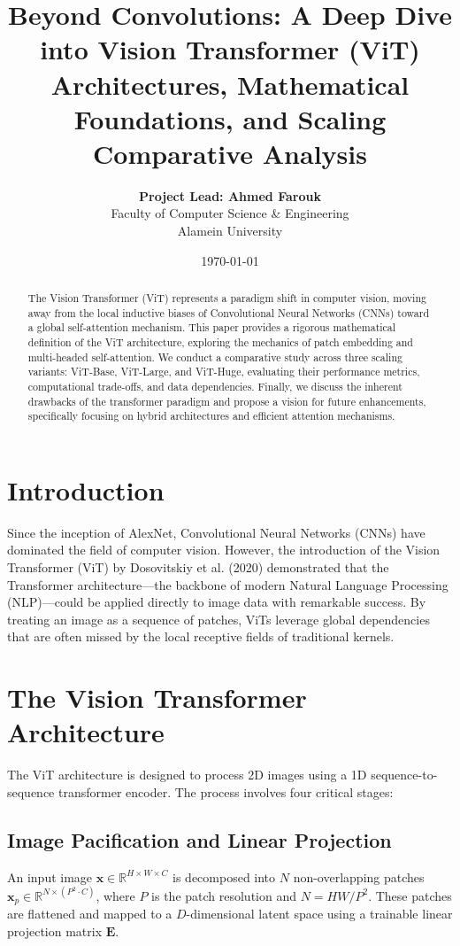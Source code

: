 \documentclass[twocolumn,10pt]{article}
\title{\textbf{Beyond Convolutions: A Deep Dive into Vision Transformer (ViT) Architectures, Mathematical Foundations, and Scaling Comparative Analysis}}
\author{
    \textbf{Project Lead: Ahmed Farouk} \\
    Faculty of Computer Science \& Engineering \\
    Alamein University
}
\date{\today}
\begin{document}
\maketitle

\begin{abstract}
The Vision Transformer (ViT) represents a paradigm shift in computer vision, moving away from the local inductive biases of Convolutional Neural Networks (CNNs) toward a global self-attention mechanism. This paper provides a rigorous mathematical definition of the ViT architecture, exploring the mechanics of patch embedding and multi-headed self-attention. We conduct a comparative study across three scaling variants: ViT-Base, ViT-Large, and ViT-Huge, evaluating their performance metrics, computational trade-offs, and data dependencies. Finally, we discuss the inherent drawbacks of the transformer paradigm and propose a vision for future enhancements, specifically focusing on hybrid architectures and efficient attention mechanisms.
\end{abstract}

\section{Introduction}
Since the inception of AlexNet, Convolutional Neural Networks (CNNs) have dominated the field of computer vision. However, the introduction of the Vision Transformer (ViT) by Dosovitskiy et al. (2020) demonstrated that the Transformer architecture—the backbone of modern Natural Language Processing (NLP)—could be applied directly to image data with remarkable success. By treating an image as a sequence of patches, ViTs leverage global dependencies that are often missed by the local receptive fields of traditional kernels.

\section{The Vision Transformer Architecture}
The ViT architecture is designed to process 2D images using a 1D sequence-to-sequence transformer encoder. The process involves four critical stages:

\subsection{Image Pacification and Linear Projection}
An input image $\mathbf{x} \in \mathbb{R}^{H \times W \times C}$ is decomposed into $N$ non-overlapping patches $\mathbf{x}_p \in \mathbb{R}^{N \times (P^2 \cdot C)}$, where $P$ is the patch resolution and $N = HW/P^2$. These patches are flattened and mapped to a $D$-dimensional latent space using a trainable linear projection matrix $\mathbf{E}$.
\end{document}
